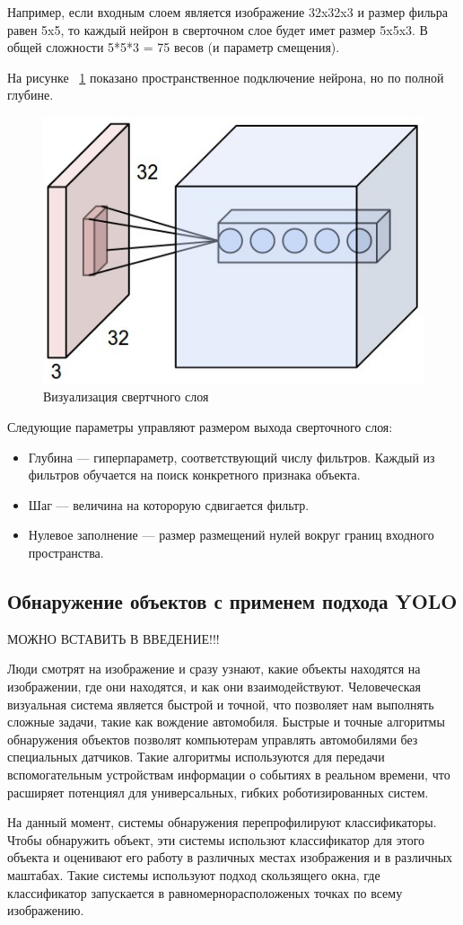 \documentclass[a4paper,english,russian]{G2-105}
\begin{document}
\par Например, если входным слоем является изображение 32x32x3 и размер фильра равен 5x5, то каждый нейрон в сверточном слое будет имет размер 5x5x3. В общей сложности 5*5*3 = 75 весов (и параметр смещения). 
\par На рисунке ~\ref{depthcol} показано пространственное подключение нейрона, но по полной глубине. 
\begin{figure}
    \includegraphics[width=0.5\linewidth]{depthcol.png}
    \caption{Визуализация свертчного слоя}
	\label{depthcol}
\end{figure}
\par Следующие параметры управляют размером выхода сверточного слоя:
\begin{itemize}
\item Глубина --- гиперпараметр, соответствующий числу фильтров. Каждый из фильтров обучается на поиск конкретного признака объекта.
\item Шаг --- величина на которорую сдвигается фильтр.
\item Нулевое заполнение --- размер размещений нулей вокруг границ входного пространства.
\end{itemize}
\subsection{Обнаружение объектов с применем подхода YOLO}
МОЖНО ВСТАВИТЬ В ВВЕДЕНИЕ!!!
\par Люди смотрят на изображение и сразу узнают, какие объекты находятся на изображении, где они находятся, и как они взаимодействуют. Человеческая визуальная система является быстрой и точной, что позволяет нам выполнять сложные задачи, такие как вождение автомобиля. Быстрые и точные алгоритмы обнаружения объектов позволят компьютерам управлять автомобилями без специальных датчиков. Такие алгоритмы используются для передачи вспомогательным устройствам информации о событиях в реальном времени, что расширяет потенциял для универсальных, гибких роботизированных систем.
\par На данный момент, системы обнаружения перепрофилируют классификаторы. Чтобы обнаружить объект, эти системы использют классификатор для этого объекта и оценивают его работу в различных местах изображения и в различных маштабах. Такие системы используют подход скользящего окна, где классификатор запускается в равномернорасположеных точках по всему изображению.
\par 
\end{document}
